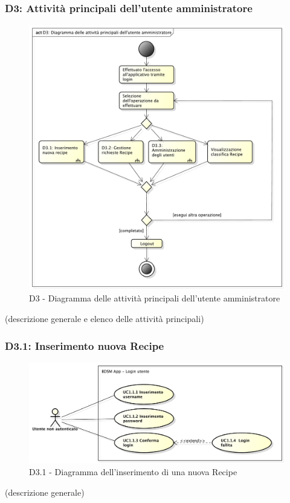 		\subsubsection{D3: Attività principali dell'utente amministratore} %
		\label{ssub:attivita_principali_dell_utente_amministratore}
		\begin{figure}[!htbp]
			\centering
			\centerline{\includegraphics[scale=0.45]{./images/D3.pdf}}
			\caption{D3 - Diagramma delle attività principali dell'utente amministratore}
		\end{figure}
		\noindent
		[TO DO] (descrizione generale e elenco delle attività principali)



		\subsubsection{D3.1: Inserimento nuova Recipe} %
		\label{ssub:inserimento_nuova_recipe}
		\begin{figure}[!htbp]
			\centering
			\centerline{\includegraphics[scale=0.45]{./images/UC1_1.pdf}}
			\caption{D3.1 - Diagramma dell'inserimento di una nuova Recipe}
		\end{figure}
		\noindent
		[TO DO] (descrizione generale)


